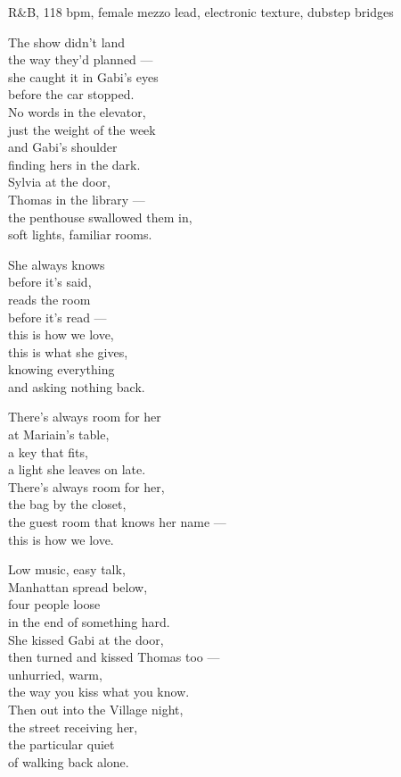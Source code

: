 

\begin{notes}
\end{notes}

\begin{style}
R\&B, 118 bpm, female mezzo lead, electronic texture, dubstep bridges
\end{style}

\begin{lyrics}

The show didn't land\\
the way they'd planned —\\
she caught it in Gabi's eyes\\
before the car stopped.\\
No words in the elevator,\\
just the weight of the week\\
and Gabi's shoulder\\
finding hers in the dark.\\
Sylvia at the door,\\
Thomas in the library —\\
the penthouse swallowed them in,\\
soft lights, familiar rooms.

She always knows\\
before it's said,\\
reads the room\\
before it's read —\\
this is how we love,\\
this is what she gives,\\
knowing everything\\
and asking nothing back.

There's always room for her\\
at Mariain's table,\\
a key that fits,\\
a light she leaves on late.\\
There's always room for her,\\
the bag by the closet,\\
the guest room that knows her name —\\
this is how we love.

Low music, easy talk,\\
Manhattan spread below,\\
four people loose\\
in the end of something hard.\\
She kissed Gabi at the door,\\
then turned and kissed Thomas too —\\
unhurried, warm,\\
the way you kiss what you know.\\
Then out into the Village night,\\
the street receiving her,\\
the particular quiet\\
of walking back alone.


\end{lyrics}
